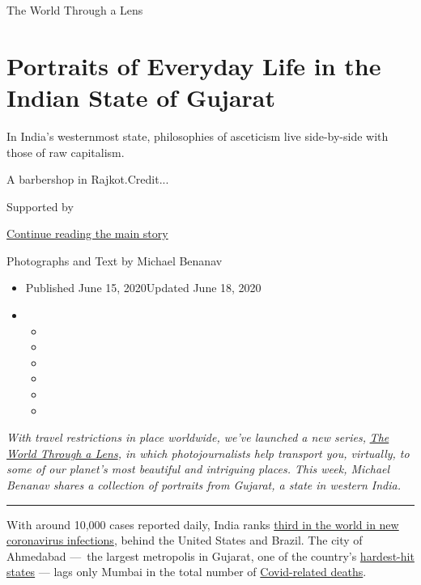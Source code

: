 The World Through a Lens

\hypertarget{portraits-of-everyday-life-in-the-indian-state-of-gujarat}{%
\section{Portraits of Everyday Life in the Indian State of
Gujarat}\label{portraits-of-everyday-life-in-the-indian-state-of-gujarat}}

In India's westernmost state, philosophies of asceticism live
side-by-side with those of raw capitalism.

A barbershop in Rajkot.Credit...

Supported by

\protect\hyperlink{after-sponsor}{Continue reading the main story}

Photographs and Text by Michael Benanav

\begin{itemize}
\item
  Published June 15, 2020Updated June 18, 2020
\item
  \begin{itemize}
  \item
  \item
  \item
  \item
  \item
  \item
  \end{itemize}
\end{itemize}

\emph{With travel restrictions in place worldwide, we've launched a new
series,}
\href{https://www.nytimes.com/column/the-world-through-a-lens}{\emph{The
World Through a Lens}}\emph{, in which photojournalists help transport
you, virtually, to some of our planet's most beautiful and intriguing
places. This week, Michael Benanav shares a collection of portraits from
Gujarat, a state in western India.}

\begin{center}\rule{0.5\linewidth}{\linethickness}\end{center}

With around 10,000 cases reported daily, India ranks
\href{https://www.nytimes.com/2020/06/10/world/asia/reopening-before-coronavirus-ends.html}{third
in the world in new coronavirus infections}, behind the United States
and Brazil. The city of Ahmedabad ---~the largest metropolis in Gujarat,
one of the country's
\href{https://www.bbc.com/news/world-asia-india-53009560}{hardest-hit
states} --- lags only Mumbai in the total number of
\href{https://timesofindia.indiatimes.com/india/ahmedabad-has-indias-highest-corona-deaths/m-population/articleshow/76226143.cms}{Covid-related
deaths}.

